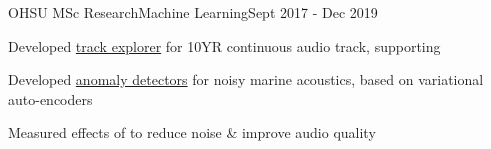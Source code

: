 \documentclass{article}
\newcommand{\LU}[1]{\hspace{-1em}{\bf Technologies : #1}}
\begin{document}
\begin{**mylist}{OHSU MSc Research}{Machine Learning}{Sept 2017 - Dec 2019}
\item Developed \href{https://github.com/probinso/ACOio}{track explorer} for 10YR continuous audio track, supporting  %
\item Developed \href{https://github.com/probinso/gumiho-network}{anomaly detectors} for noisy marine acoustics, based on variational auto-encoders
\item Measured effects of  to reduce noise \& improve audio quality
\end{**mylist}
\end{document}
